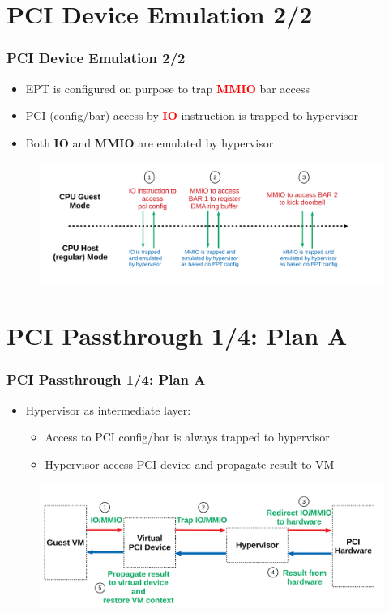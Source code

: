 \documentclass[aspectratio=169]{beamer}
\begin{document}

\section{PCI Device Emulation 2/2}
\begin{frame}
\frametitle{PCI Device Emulation 2/2}
\begin{itemize}
\item EPT is configured on purpose to trap \textbf{\textcolor{red}{MMIO}} bar access
\item PCI (config/bar) access by \textbf{\textcolor{red}{IO}} instruction is trapped to hypervisor
\item Both \textbf{IO} and \textbf{MMIO} are emulated by hypervisor
\end{itemize}
\begin{figure}
\includegraphics[width=1.0\linewidth]{figures/pci_access.pdf}
\end{figure}
\end{frame}


\section{PCI Passthrough 1/4: Plan A}
\begin{frame}
\frametitle{PCI Passthrough 1/4: Plan A}
\begin{itemize}
\item Hypervisor as intermediate layer:
\begin{itemize}
\item Access to PCI config/bar is always trapped to hypervisor
\item Hypervisor access PCI device and propagate result to VM
\end{itemize}
\end{itemize}
\begin{figure}
\includegraphics[width=1.0\linewidth]{figures/plan_a.pdf}
\end{figure}
\end{frame}
\end{document}
